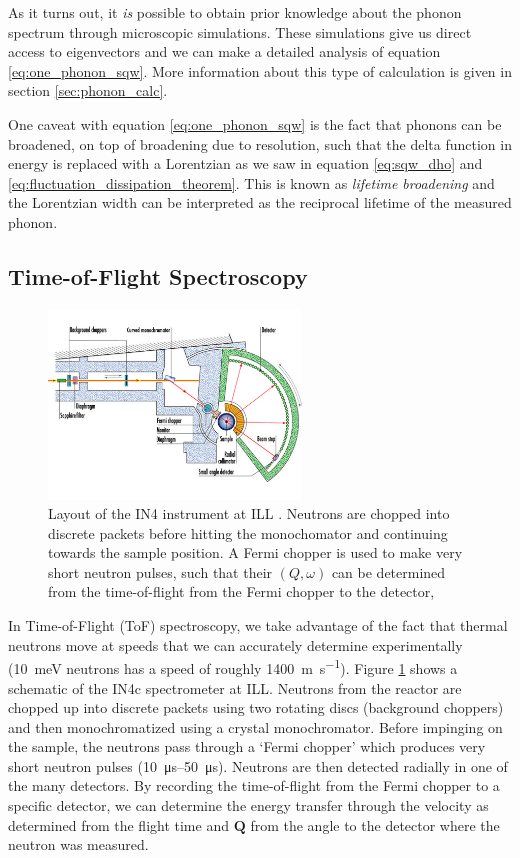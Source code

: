 As it turns out, it \emph{is} possible to obtain prior knowledge about the phonon spectrum through microscopic simulations. These simulations give us direct access to eigenvectors and we can make a detailed analysis of equation \eqref{eq:one_phonon_sqw}. More information about this type of calculation is given in section \ref{sec:phonon_calc}.

One caveat with equation \eqref{eq:one_phonon_sqw} is the fact that phonons can be broadened, on top of broadening due to resolution, such that the delta function in energy is replaced with a Lorentzian as we saw in equation \eqref{eq:sqw_dho} and \eqref{eq:fluctuation_dissipation_theorem}. This is known as \emph{lifetime broadening} and the Lorentzian width can be interpreted as the reciprocal lifetime of the measured phonon.

\subsection{Time-of-Flight Spectroscopy}

\begin{figure}
	\centering
	\includegraphics[width=0.6\textwidth]{fig/method/ns/in4.jpg}
	\caption[in4 layout]{Layout of the IN4 instrument at ILL \cite{in4}. Neutrons are chopped into discrete packets before hitting the monochomator and continuing towards the sample position. A Fermi chopper is used to make very short neutron pulses, such that their $(Q,\omega)$ can be determined from the time-of-flight from the Fermi chopper to the detector,}
	\label{fig:in4}
\end{figure}

In Time-of-Flight (ToF) spectroscopy, we take advantage of the fact that thermal neutrons move at speeds that we can accurately determine experimentally (\SI{10}{\milli\eV} neutrons has a speed of roughly \SI{1400}{\meter\per\second}). Figure \ref{fig:in4} shows a schematic of the IN4c spectrometer at ILL. Neutrons from the reactor are chopped up into discrete packets using two rotating discs (background choppers) and then monochromatized using a crystal monochromator. Before impinging on the sample, the neutrons pass through a `Fermi chopper' which produces very short neutron pulses (\SIrange{10}{50}{\micro\second}). Neutrons are then detected radially in one of the many detectors. By recording the time-of-flight from the Fermi chopper to a specific detector, we can determine the energy transfer through the velocity as determined from the flight time and $\bm{Q}$ from the angle to the detector where the neutron was measured.

